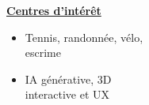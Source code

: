\documentclass[letterpaper,10pt]{article}
\begin{document}
\begin{minipage}[t]{0.28\textwidth}
  \raggedright
  \textbf{\underline{Centres d'intérêt}}\\[-2pt]
  {\scriptsize
    \begin{itemize}[leftmargin=*,itemsep=1pt,parsep=0pt,topsep=0pt,partopsep=0pt]
      \item Tennis, randonnée, vélo, \\escrime
      \item IA générative, 3D \\interactive et UX
    \end{itemize}
  }
\end{minipage}



\end{document}
